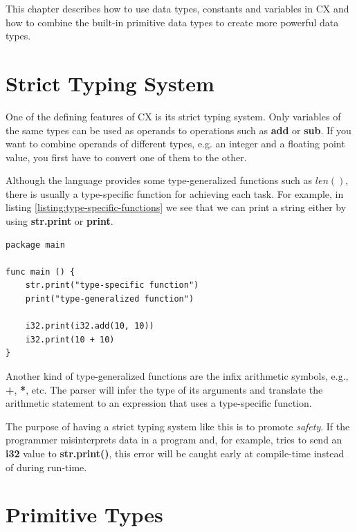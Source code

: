 \documentclass[11pt,fleqn,openany]{book} %
\begin{document}
This chapter describes how to use data types, constants and variables in CX and how to combine the built-in primitive data types to create more powerful data types.

\section{Strict Typing System}
\label{section:strict-type-system}

One of the defining features of CX is its strict typing system. Only variables of the same types can be used as operands to operations such as \textbf{add} or \textbf{sub}. If you want to combine operands of different types, e.g. an integer and a floating point value, you first have to convert one of them to the other.

Although the language provides some type-generalized functions such as $len()$, there is usually a type-specific function for achieving each task. For example, in listing \ref{listing:type-specific-functions} we see that we can print a string either by using \textbf{str.print} or \textbf{print}.

\begin{lstlisting}[caption={Type-specific functions},captionpos=b,label={listing:type-specific-functions}]
package main

func main () {
 	str.print("type-specific function")
    print("type-generalized function")
    
    i32.print(i32.add(10, 10))
    i32.print(10 + 10)
}
\end{lstlisting}

Another kind of type-generalized functions are the infix arithmetic symbols, e.g., \textbf{+}, \textbf{*}, etc. The parser will infer the type of its arguments and translate the arithmetic statement to an expression that uses a type-specific function.

The purpose of having a strict typing system like this is to promote \emph{safety}. If the programmer misinterprets data in a program and, for example, tries to send an \textbf{i32} value to \textbf{str.print()}, this error will be caught early at compile-time instead of during run-time.

\section{Primitive Types}

\end{document}
